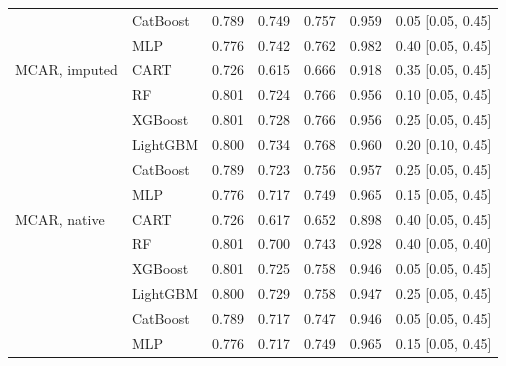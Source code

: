 \begin{table}[p]
\begin{tabular}{@{}llrrrrl@{}}
 & CatBoost & 0.789 & 0.749 & 0.757 & 0.959 & 0.05 [0.05, 0.45] \\
 & MLP & 0.776 & 0.742 & 0.762 & 0.982 & 0.40 [0.05, 0.45] \\
\midrule
MCAR, imputed & CART & 0.726 & 0.615 & 0.666 & 0.918 & 0.35 [0.05, 0.45] \\
 & RF & 0.801 & 0.724 & 0.766 & 0.956 & 0.10 [0.05, 0.45] \\
 & XGBoost & 0.801 & 0.728 & 0.766 & 0.956 & 0.25 [0.05, 0.45] \\
 & LightGBM & 0.800 & 0.734 & 0.768 & 0.960 & 0.20 [0.10, 0.45] \\
 & CatBoost & 0.789 & 0.723 & 0.756 & 0.957 & 0.25 [0.05, 0.45] \\
 & MLP & 0.776 & 0.717 & 0.749 & 0.965 & 0.15 [0.05, 0.45] \\
\midrule
MCAR, native & CART & 0.726 & 0.617 & 0.652 & 0.898 & 0.40 [0.05, 0.45] \\
 & RF & 0.801 & 0.700 & 0.743 & 0.928 & 0.40 [0.05, 0.40] \\
 & XGBoost & 0.801 & 0.725 & 0.758 & 0.946 & 0.05 [0.05, 0.45] \\
 & LightGBM & 0.800 & 0.729 & 0.758 & 0.947 & 0.25 [0.05, 0.45] \\
 & CatBoost & 0.789 & 0.717 & 0.747 & 0.946 & 0.05 [0.05, 0.45] \\
 & MLP & 0.776 & 0.717 & 0.749 & 0.965 & 0.15 [0.05, 0.45] \\
\bottomrule
\end{tabular}
\end{table}

